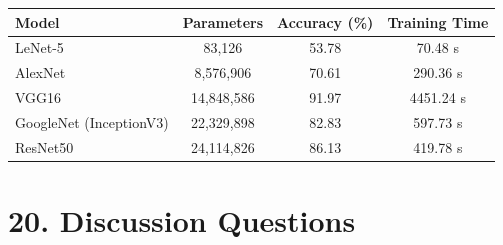 \documentclass[11pt]{article}
\begin{document}
\begin{center}

\begin{tabular}{|l|c|c|c|}

\hline

Model &
Parameters &
Accuracy (\%) &
Training Time\\

\hline

LeNet-5 & 83,126 & 53.78 & 70.48 s\\

\hline

AlexNet & 8,576,906 & 70.61 & 290.36 s\\

\hline

VGG16 & 14,848,586 & 91.97 & 4451.24 s\\

\hline

GoogleNet (InceptionV3) & 22,329,898 & 82.83 & 597.73 s\\

\hline

ResNet50 & 24,114,826 & 86.13 & 419.78 s\\

\hline

\end{tabular}

\end{center}



\vspace{20mm}

\section*{20. Discussion Questions}
\end{document}
